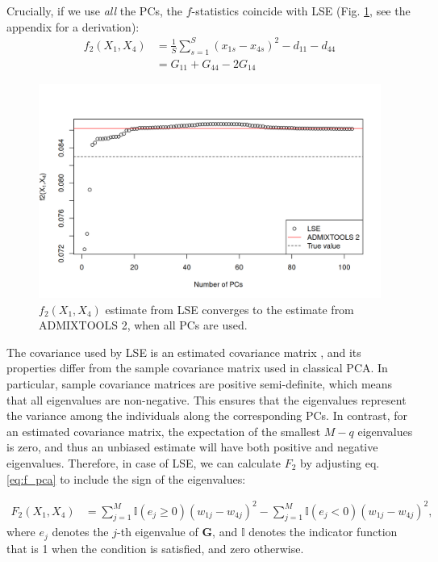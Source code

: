 \documentclass[12pt]{article}
\begin{document}
Crucially, if we use \emph{all} the PCs, the $f$-statistics coincide with LSE (Fig. \ref{figS4:lse_admix}, see the appendix for a derivation): 
\begin{align}
    f_2(X_1, X_4) &= \frac{1}{S} \sum_{s=1}^S (x_{1s} - x_{4s})^2 - d_{11} - d_{44} \nonumber\\
    &= G_{11} + G_{44} - 2 G_{14} \label{eq:lse}
\end{align}

\begin{figure}[ht!]
    \includegraphics[width=16.5cm]{Images/ppca/Supplement/lse_admix.png}
    \centering
    \caption{$f_2(X_1,X_4)$ estimate from LSE converges to the estimate from ADMIXTOOLS 2, when all PCs are used.}
    \label{figS4:lse_admix}
\end{figure}


The covariance used by LSE is an estimated covariance matrix \citep{van_waaij_evaluation_2023}, and its properties differ from the sample covariance matrix used in classical PCA. In particular, sample covariance matrices are positive semi-definite, which means that all eigenvalues are non-negative. This ensures that the eigenvalues represent the variance among the individuals along the corresponding PCs. In contrast, for an estimated covariance matrix, the expectation of the smallest $M-q$ eigenvalues is zero, and thus an unbiased estimate will have both positive and negative eigenvalues. Therefore, in case of LSE, we can calculate $F_2$ by adjusting eq. \ref{eq:f_pca} to include the sign of the eigenvalues:


\begin{align}\label{eq:f_lse}
F_2(X_1,X_4) &= \sum_{j=1}^{M}\mathbb{I}(e_j \geq 0) (w_{1j} - w_{4j})^2 - \sum_{j=1}^M \mathbb{I}(e_j <0) (w_{1j} - w_{4j})^2,
\end{align}
where $e_j$ denotes the $j$-th eigenvalue of $\mathbf{G}$, and $\mathbb{I}$ denotes the indicator function that is 1 when the condition is satisfied, and zero otherwise.
\end{document}
